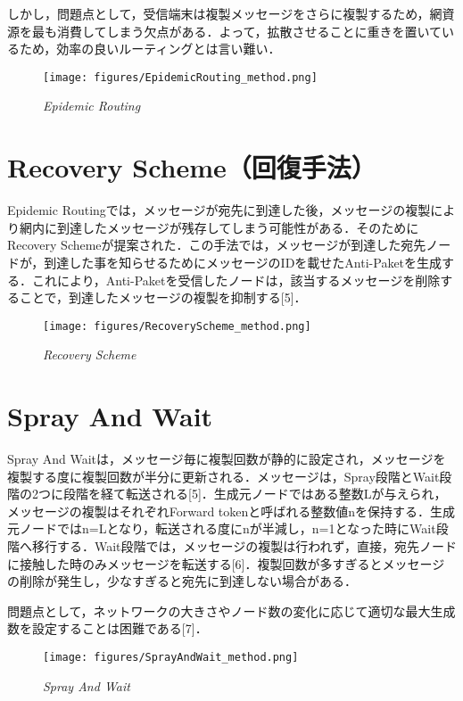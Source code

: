 \documentclass[11pt]{icsthesis}
\begin{document}
しかし，問題点として，受信端末は複製メッセージをさらに複製するため，網資源を最も消費してしまう欠点がある．よって，拡散させることに重きを置いているため，効率の良いルーティングとは言い難い．

\begin{figure}[h]
\centering
\texttt{[image: figures/EpidemicRouting\_method.png]}
\caption[]{\it{Epidemic Routing}}
\end{figure}

\newpage

\section{Recovery Scheme（回復手法）}
Epidemic Routingでは，メッセージが宛先に到達した後，メッセージの複製により網内に到達したメッセージが残存してしまう可能性がある．そのためにRecovery Schemeが提案された．この手法では，メッセージが到達した宛先ノードが，到達した事を知らせるためにメッセージのIDを載せたAnti-Paketを生成する．これにより，Anti-Paketを受信したノードは，該当するメッセージを削除することで，到達したメッセージの複製を抑制する[5]．

\begin{figure}[h]
\centering
\texttt{[image: figures/RecoveryScheme\_method.png]}
\caption[]{\it{Recovery Scheme}}
\end{figure}

\newpage

\section{Spray And Wait}
Spray And Waitは，メッセージ毎に複製回数が静的に設定され，メッセージを複製する度に複製回数が半分に更新される．メッセージは，Spray段階とWait段階の2つに段階を経て転送される[5]．生成元ノードではある整数Lが与えられ，メッセージの複製はそれぞれForward tokenと呼ばれる整数値nを保持する．生成元ノードではn=Lとなり，転送される度にnが半減し，n=1となった時にWait段階へ移行する．Wait段階では，メッセージの複製は行われず，直接，宛先ノードに接触した時のみメッセージを転送する[6]．複製回数が多すぎるとメッセージの削除が発生し，少なすぎると宛先に到達しない場合がある．

問題点として，ネットワークの大きさやノード数の変化に応じて適切な最大生成数を設定することは困難である[7]．

\begin{figure}[h]
\centering
\texttt{[image: figures/SprayAndWait\_method.png]}
\caption[]{\it{Spray And Wait}}
\end{figure}
\end{document}
